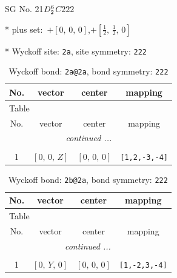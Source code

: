 \documentclass[fleqn,8pt]{jsarticle}
\begin{document}
\setcounter{MaxMatrixCols}{32}

\renewcommand{\tablename}{Table~}
\renewcommand{\figurename}{Figure~}
\begin{center}
\LARGE
SG No. 21\quad$D_{\rm 2}^{6}$\quad$C222$\quad[ orthorhombic ]
\end{center}

* plus set:\,\,\,$+\left[ 0,\, 0,\, 0 \right]$,\quad $+\left[ \frac{1}{2},\, \frac{1}{2},\, 0 \right]$


* Wyckoff site: {\tt 2a}, site symmetry: {\tt 222}
\renewcommand{\arraystretch}{1.2}
\begin{longtable}{cccc}
\caption{Wyckoff bond: {\tt 2a@2a}, bond symmetry: {\tt 222}}
 \\
 \hline \hline
No. & vector & center & mapping \\ \hline \endfirsthead

\multicolumn{3}{l}{\tablename\ \thetable{}} \\
 \hline \hline
No. & vector & center & mapping \\ \hline \endhead

 \hline \hline
\multicolumn{3}{r}{\footnotesize\it continued ...} \\ \endfoot

 \hline \hline
\multicolumn{3}{r}{} \\ \endlastfoot

1 & $\left[ 0,\, 0,\, Z \right]$ & $\left[ 0,\, 0,\, 0 \right]$ & {\tt [1,2,-3,-4]} \\
\end{longtable}
\renewcommand{\arraystretch}{1.2}
\begin{longtable}{cccc}
\caption{Wyckoff bond: {\tt 2b@2a}, bond symmetry: {\tt 222}}
 \\
 \hline \hline
No. & vector & center & mapping \\ \hline \endfirsthead

\multicolumn{3}{l}{\tablename\ \thetable{}} \\
 \hline \hline
No. & vector & center & mapping \\ \hline \endhead

 \hline \hline
\multicolumn{3}{r}{\footnotesize\it continued ...} \\ \endfoot

 \hline \hline
\multicolumn{3}{r}{} \\ \endlastfoot

1 & $\left[ 0,\, Y,\, 0 \right]$ & $\left[ 0,\, 0,\, 0 \right]$ & {\tt [1,-2,3,-4]} \\
\end{longtable}
\end{document}
